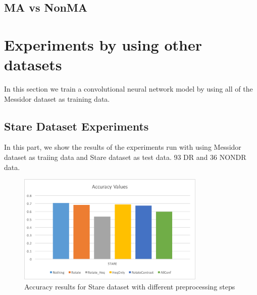 \subsection{MA vs NonMA}
\section{Experiments by using other datasets}
In this section we train a convolutional neural network model by using all of the Messidor dataset as training data. 
\subsection{Stare Dataset Experiments}
In this part, we show the results of the experiments run with using Messidor dataset as traiing data and Stare dataset as test data. 93 DR and 36 NONDR data. 

\begin{figure}[b]
\centering
\includegraphics[width=0.8\textwidth]{Figures/stare.png}
\caption{Accuracy results for Stare dataset with different preprocessing steps}
\label{delta}
\end{figure}
